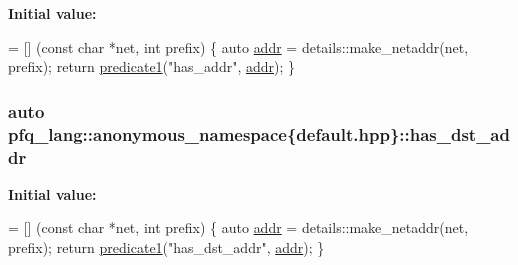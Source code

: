 {\bfseries Initial value\+:}
\begin{DoxyCode}
= [] (\textcolor{keyword}{const} \textcolor{keywordtype}{char} *net, \textcolor{keywordtype}{int} prefix)
        \{
            \textcolor{keyword}{auto} \hyperlink{namespacepfq__lang_1_1anonymous__namespace_02default_8hpp_03_aafce8334d1be83bff9a2115439c8c453}{addr} = details::make\_netaddr(net, prefix);
            \textcolor{keywordflow}{return} \hyperlink{namespacepfq__lang_ad4fceab90861beacc0490bd58a72bb05}{predicate1}(\textcolor{stringliteral}{"has\_addr"}, \hyperlink{namespacepfq__lang_1_1anonymous__namespace_02default_8hpp_03_aafce8334d1be83bff9a2115439c8c453}{addr});
        \}
\end{DoxyCode}
\hypertarget{namespacepfq__lang_1_1anonymous__namespace_02default_8hpp_03_af223a0513ceffa69c0b8535a7cca12da}{
\subsubsection[{has\+\_\+dst\+\_\+addr}]{\setlength{\rightskip}{0pt plus 5cm}auto pfq\+\_\+lang\+::anonymous\+\_\+namespace\{default.\+hpp\}\+::has\+\_\+dst\+\_\+addr}}\label{namespacepfq__lang_1_1anonymous__namespace_02default_8hpp_03_af223a0513ceffa69c0b8535a7cca12da}
{\bfseries Initial value\+:}
\begin{DoxyCode}
= [] (\textcolor{keyword}{const} \textcolor{keywordtype}{char} *net, \textcolor{keywordtype}{int} prefix)
        \{
            \textcolor{keyword}{auto} \hyperlink{namespacepfq__lang_1_1anonymous__namespace_02default_8hpp_03_aafce8334d1be83bff9a2115439c8c453}{addr} = details::make\_netaddr(net, prefix);
            \textcolor{keywordflow}{return} \hyperlink{namespacepfq__lang_ad4fceab90861beacc0490bd58a72bb05}{predicate1}(\textcolor{stringliteral}{"has\_dst\_addr"}, \hyperlink{namespacepfq__lang_1_1anonymous__namespace_02default_8hpp_03_aafce8334d1be83bff9a2115439c8c453}{addr});
        \}
\end{DoxyCode}
